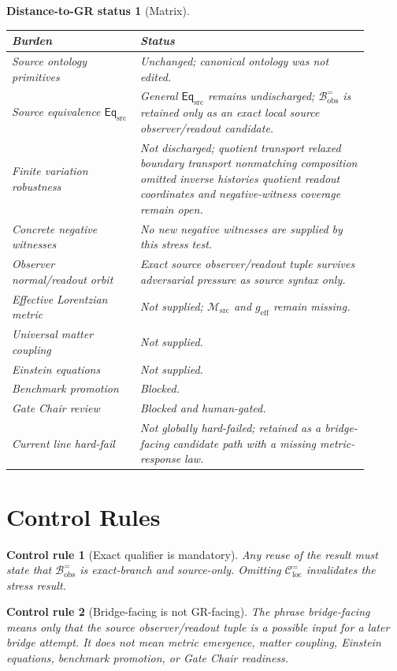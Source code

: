 \documentclass[11pt]{article}
\newcommand{\EqSrc}{\mathsf{Eq}_{\mathrm{src}}}
\newcommand{\Bobs}{\mathcal{B}^{=}_{\mathrm{obs}}}
\newcommand{\Msrc}{\mathcal{M}_{\mathrm{src}}}
\newcommand{\geff}{g_{\mathrm{eff}}}
\newtheorem{controlrule}{Control rule}
\newtheorem{distancestatus}{Distance-to-GR status}
\begin{document}
\begin{distancestatus}[Matrix]
\begin{center}
\small
\begin{tabular}{p{0.32\linewidth}p{0.58\linewidth}}
\hline
Burden & Status \\
\hline
Source ontology primitives & Unchanged; canonical ontology was not edited. \\
Source equivalence \(\EqSrc\) & General \(\EqSrc\) remains undischarged; \(\Bobs\) is retained only as an exact local source observer/readout candidate. \\
Finite variation robustness & Not discharged; quotient transport relaxed boundary transport nonmatching composition omitted inverse histories quotient readout coordinates and negative-witness coverage remain open. \\
Concrete negative witnesses & No new negative witnesses are supplied by this stress test. \\
Observer normal/readout orbit & Exact source observer/readout tuple survives adversarial pressure as source syntax only. \\
Effective Lorentzian metric & Not supplied; \(\Msrc\) and \(\geff\) remain missing. \\
Universal matter coupling & Not supplied. \\
Einstein equations & Not supplied. \\
Benchmark promotion & Blocked. \\
Gate Chair review & Blocked and human-gated. \\
Current line hard-fail & Not globally hard-failed; retained as a bridge-facing candidate path with a missing metric-response law. \\
\hline
\end{tabular}
\end{center}
\end{distancestatus}

\section{Control Rules}

\begin{controlrule}[Exact qualifier is mandatory]
Any reuse of the result must state that \(\Bobs\) is exact-branch and
source-only. Omitting \(\mathcal{C}^{=}_{\mathrm{loc}}\) invalidates
the stress result.
\end{controlrule}

\begin{controlrule}[Bridge-facing is not GR-facing]
The phrase bridge-facing means only that the source observer/readout
tuple is a possible input for a later bridge attempt. It does not mean
metric emergence, matter coupling, Einstein equations, benchmark
promotion, or Gate Chair readiness.
\end{controlrule}
\end{document}

